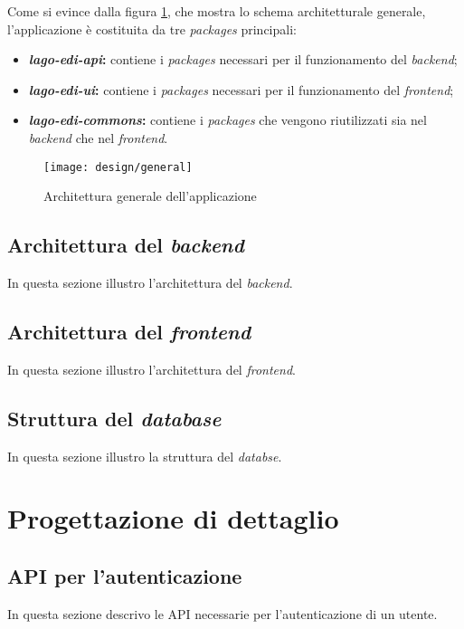 Come si evince dalla figura \ref{fig:general-design}, che mostra lo schema architetturale generale, l'applicazione è costituita da tre \emph{packages} principali:
\begin{itemize}
  \item \textbf{\emph{lago-edi-api}:} contiene i \emph{packages} necessari per il funzionamento del \emph{\gls{backend}};
  \item \textbf{\emph{lago-edi-ui}:} contiene i \emph{packages} necessari per il funzionamento del \emph{\gls{frontend}};
  \item \textbf{\emph{lago-edi-commons}:} contiene i \emph{packages} che vengono riutilizzati sia nel \emph{\gls{backend}} che nel \emph{\gls{frontend}}.
\end{itemize}

\begin{figure}[!ht]
  \begin{center}
    \texttt{[image: design/general]}
    \caption{Architettura generale dell'applicazione}
    \label{fig:general-design}
  \end{center}
\end{figure}

\subsection{Architettura del \emph{backend}}
In questa sezione illustro l'architettura del \emph{backend}.

\subsection{Architettura del \emph{frontend}}
In questa sezione illustro l'architettura del \emph{frontend}.

\subsection{Struttura del \emph{database}}
In questa sezione illustro la struttura del \emph{databse}.

\section{Progettazione di dettaglio}

\subsection{API per l'autenticazione}
In questa sezione descrivo le API necessarie per l'autenticazione di un utente.

